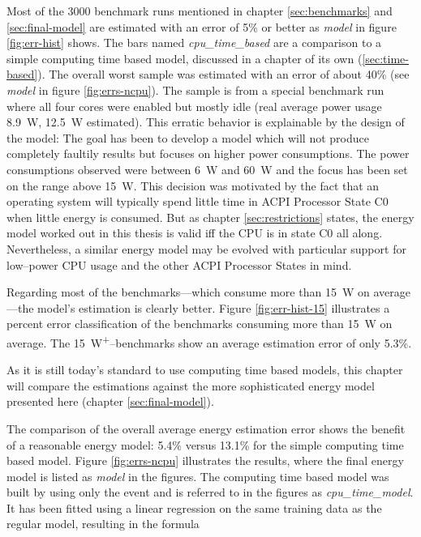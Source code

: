 Most of the 3000 benchmark runs mentioned in chapter \ref{sec:benchmarks} and
\ref{sec:final-model} are estimated with an error of 5\% or better as
\emph{model} in figure \ref{fig:err-hist} shows. The bars named
\emph{cpu\_\-time\_\-based} are a comparison to a simple computing time based
model, discussed in a chapter of its own (\ref{sec:time-based}). The overall
worst sample was estimated with an error of about 40\% (see \emph{model} in
figure \ref{fig:errs-ncpu}). The sample is from a special benchmark run where
all four cores were enabled but mostly idle (real average power usage
\SI{8.9}{\watt}, \SI{12.5}{\watt} estimated). This erratic behavior is
explainable by the design of the model: The goal has been to develop a model
which will not produce completely faultily results but focuses on higher power
consumptions. The power consumptions observed were between \SI{6}{\watt} and
\SI{60}{\watt} and the focus has been set on the range above \SI{15}{\watt}.
This decision was motivated by the fact that an operating system will typically
spend little time in ACPI Processor State C0 \cite{wiki:ACPI} when
little energy is consumed. But as chapter \ref{sec:restrictions} states, the
energy model worked out in this thesis is valid iff the CPU is in state C0
all along.  Nevertheless, a similar energy model may be evolved with
particular support for low--power CPU usage and the other ACPI Processor States
in mind.

Regarding most of the benchmarks---which consume more than
\SI{15}{\watt} on average---the model's estimation is clearly better. Figure
\ref{fig:err-hist-15} illustrates a percent error classification of the
benchmarks consuming more than \SI{15}{\watt} on average. The
\SI{15}{\watt}\textsuperscript{+}--benchmarks show an average estimation error
of only 5.3\%.


\label{sec:time-based}

As it is still today's standard to use computing time based models, this chapter
will compare the estimations against the more sophisticated energy model
presented here (chapter \ref{sec:final-model}).

The comparison of the overall average energy estimation error shows the benefit
of a reasonable energy model: 5.4\% versus 13.1\% for the simple computing time
based model. Figure \ref{fig:errs-ncpu} illustrates the results, where the final
energy model is listed as \emph{model} in the figures. The computing time based
model was built by using only the event  and is
referred to in the figures as \emph{cpu\_\-time\_\-model}. It has been fitted
using a linear regression on the same training data as the regular model,
resulting in the formula

